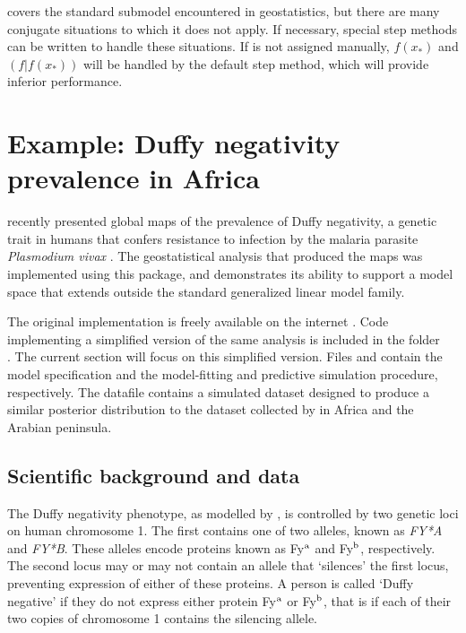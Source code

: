 \documentclass[article]{jss}
\begin{document}
 covers the standard submodel encountered in geostatistics, but there are many conjugate situations to which it does not apply. If necessary, special step methods can be written to handle these situations. If  is not assigned manually, $f(x_*)$ and $(f|f(x_*))$ will be handled by the default  step method, which will provide inferior performance. 


\section{Example: Duffy negativity prevalence in Africa}
\label{sec:duffy} 

\cite{Howes} recently presented global maps of the prevalence of Duffy negativity, a genetic trait in humans that confers resistance to infection by the malaria parasite \emph{Plasmodium vivax} \citep{duffy-vivax}. The geostatistical analysis that produced the maps was implemented using this package, and demonstrates its ability to support a model space that extends outside the standard generalized linear model family. 

The original implementation is freely available on the internet \citep{duffy-code, generic-mbg}. Code implementing a simplified version of the same analysis is included in the folder \\. The current section will focus on this simplified version. Files  and  contain the model specification and the model-fitting and predictive simulation procedure, respectively. The datafile  contains a simulated dataset designed to produce a similar posterior distribution to the dataset collected by \cite{Howes} in Africa and the Arabian peninsula. 

\subsection{Scientific background and data}
\label{subsec:duffy-data} 
The Duffy negativity phenotype, as modelled by \cite{Howes}, is controlled by two genetic loci on human chromosome 1. The first contains one of two alleles, known as \emph{FY*A} and \emph{FY*B}. These alleles encode proteins known as Fy$^\textup{a}$ and Fy$^\textup{b}$, respectively. The second locus may or may not contain an allele that `silences' the first locus, preventing expression of either of these proteins. A person is called `Duffy negative' if they do not express either protein Fy$^\textup{a}$ or Fy$^\textup{b}$, that is if each of their two copies of chromosome 1 contains the silencing allele. 
\end{document}
